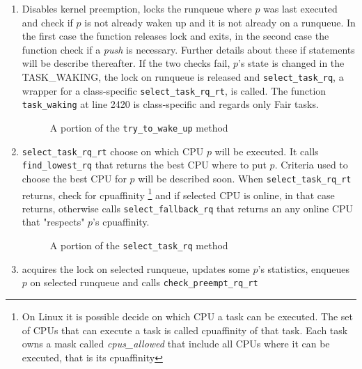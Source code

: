 \begin{enumerate}
\item Disables kernel preemption, locks the runqueue where $p$ was last executed and check 
if $p$ is not already waken up and it is not already on a runqueue. In the first case the 
function releases lock and exits, in the second case the function check if a
\textit{push} is necessary. Further details about these if statements will be
describe thereafter. If the two checks fail, $p$'s state is changed in the TASK\_WAKING, the
lock on runqueue is released and \texttt{select\_task\_rq}, a wrapper for a 
class-specific \texttt{select\_task\_rq\_rt}, is called. The function 
\texttt{task\_waking} at line 2420 is class-specific and regards only Fair tasks.

\begin{figure}[h]
  \lstset{basicstyle=\footnotesize, language=c, captionpos=b, frame=single,label=lis:steps_ttwu}
  
  \caption{A portion of the \texttt{try\_to\_wake\_up} method}
  \label{code:steps_ttwu}
\end{figure}

\item \texttt{select\_task\_rq\_rt} choose on which CPU $p$ will be executed. It
calls \texttt{find\_lowest\_rq} that returns the best CPU where to put $p$. Criteria
used to choose the best CPU for $p$ will be described soon. When \texttt{select\_task\_rq\_rt} 
returns, check for cpuaffinity \footnote{On Linux it is possible decide on which
CPU a task can be executed. The set of CPUs that can execute a task is called 
cpuaffinity of that task. Each task owns a mask called \textit{cpus\_allowed} 
that include all CPUs where it can be executed, that is its cpuaffinity} and 
if selected CPU is online, in that case returns, otherwise calls 
\texttt{select\_fallback\_rq} that returns an any online CPU that "respects" 
$p$'s cpuaffinity.

\begin{figure}[h]
  \lstset{basicstyle=\footnotesize, language=c, captionpos=b, frame=single,label=lis:select_task}
  
  \caption{A portion of the \texttt{select\_task\_rq} method}
  \label{code:select_task}
\end{figure}

\item acquires the lock on selected runqueue, updates some $p$'s statistics, enqueues 
$p$ on selected runqueue and calls \texttt{check\_preempt\_rq\_rt} 


\end{enumerate}
